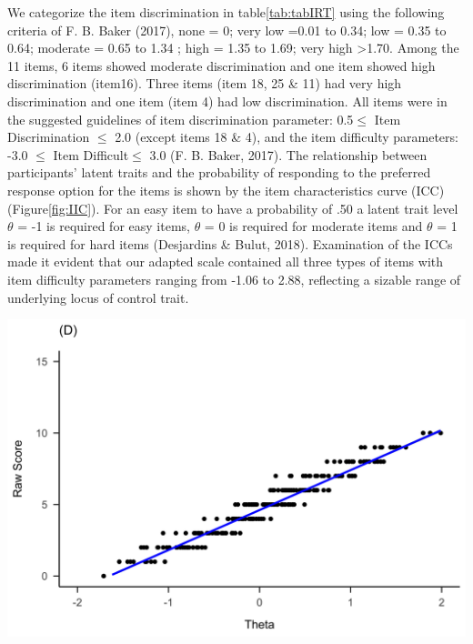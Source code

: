 \documentclass[
  english,
  man]{apa6}
\begin{document}
We categorize the item discrimination in table\ref{tab:tabIRT} using the following criteria of F. B. Baker (2017), none = 0; very low =0.01 to 0.34; low = 0.35 to 0.64; moderate = 0.65 to 1.34 ; high = 1.35 to 1.69; very high \textgreater1.70. Among the 11 items, 6 items showed moderate discrimination and one item showed high discrimination (item16). Three items (item 18, 25 \& 11) had very high discrimination and one item (item 4) had low discrimination. All items were in the suggested guidelines of item discrimination parameter: 0.5\(\le\) Item Discrimination \(\le\) 2.0 (except items 18 \& 4), and the item difficulty parameters: -3.0 \(\le\) Item Difficult\(\le\) 3.0 (F. B. Baker, 2017). The relationship between participants' latent traits and the probability of responding to the preferred response option for the items is shown by the item characteristics curve (ICC) (Figure\ref{fig:IIC}). For an easy item to have a probability of .50 a latent trait level \(\theta\) = -1 is required for easy items, \(\theta\) = 0 is required for moderate items and \(\theta\) = 1 is required for hard items (Desjardins \& Bulut, 2018). Examination of the ICCs made it evident that our adapted scale contained all three types of items with item difficulty parameters ranging from -1.06 to 2.88, reflecting a sizable range of underlying locus of control trait.

\includegraphics{Rotterpaper_files/figure-latex/irt-plots-1.png}
\end{document}
